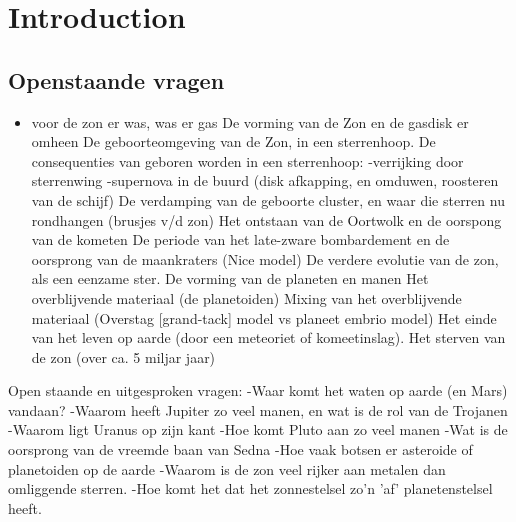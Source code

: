 \documentclass[11pt,fleqn]{book} %
\begin{document}

\pagestyle{fancy} %



\chapter{Introduction}

\section{Openstaande vragen}

\begin{remark}
   
\begin{itemize} 
\item voor de zon er was, was er gas
De vorming van de Zon en de gasdisk er omheen
De geboorteomgeving van de Zon, in een sterrenhoop.
De consequenties van geboren worden in een sterrenhoop:
   -verrijking door sterrenwing
   -supernova in de buurd (disk afkapping, en omduwen, roosteren van de schijf)
De verdamping van de geboorte cluster, en waar die sterren nu rondhangen (brusjes v/d zon)
Het ontstaan van de Oortwolk en de oorspong van de kometen
De periode van het late-zware bombardement en de oorsprong van de maankraters (Nice model)
De verdere evolutie van de zon, als een eenzame ster.
De vorming van de planeten en manen
Het overblijvende materiaal (de planetoiden)
Mixing van het overblijvende materiaal (Overstag [grand-tack] model vs planeet embrio model)
Het einde van het leven op aarde (door een meteoriet of komeetinslag).
Het sterven van de zon (over ca. 5 miljar jaar)
\end{itemize}

\begin{itemize}
Open staande en uitgesproken vragen:
-Waar komt het waten op aarde (en Mars) vandaan?
-Waarom heeft Jupiter zo veel manen, en wat is de rol van de Trojanen
-Waarom ligt Uranus op zijn kant
-Hoe komt Pluto aan zo veel manen
-Wat is de oorsprong van de vreemde baan van Sedna
-Hoe vaak botsen er asteroide of planetoiden op de aarde
-Waarom is de zon veel rijker aan metalen dan omliggende sterren.
-Hoe komt het dat het zonnestelsel zo'n 'af' planetenstelsel heeft.
\end{itemize}
\end{remark}
\end{document}
